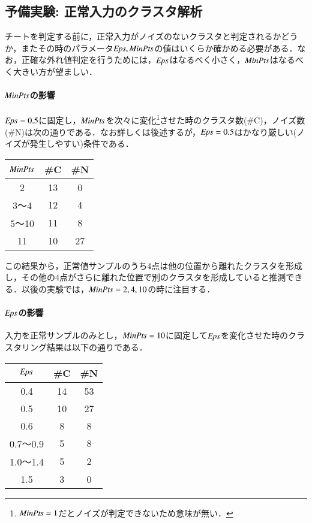 \subsection{予備実験: 正常入力のクラスタ解析}
チートを判定する前に，正常入力がノイズのないクラスタと判定されるかどうか，またその時のパラメータ${\it Eps}, {\it MinPts}$の値はいくらか確かめる必要がある．なお，正確な外れ値判定を行うためには，${\it Eps}$はなるべく小さく，${\it MinPts}$はなるべく大きい方が望ましい．

\paragraph{${\it MinPts}$の影響}
${\it Eps} = 0.5$に固定し，${\it MinPts}$を次々に変化\footnote{${\it MinPts} = 1$だとノイズが判定できないため意味が無い．}させた時のクラスタ数(\#C)，ノイズ数(\#N)は次の通りである．なお詳しくは後述するが，${\it Eps} = 0.5$はかなり厳しい(ノイズが発生しやすい)条件である．

\begin{table}[htbp]
\begin{center}
\begin{tabular}{c|cc}
${\it MinPts}$ & \#C & \#N \\ \hline
2 & 13 & 0 \\
3〜4 & 12 & 4 \\
5〜10 & 11 & 8 \\
11 & 10 & 27
\end{tabular}
\end{center}
\end{table}

この結果から，正常値サンプルのうち4点は他の位置から離れたクラスタを形成し，その他の4点がさらに離れた位置で別のクラスタを形成していると推測できる．以後の実験では，${\it MinPts}=2, 4, 10$の時に注目する．

\paragraph{${\it Eps}$の影響}
入力を正常サンプルのみとし，${\it MinPts} = 10$に固定して${\it Eps}$を変化させた時のクラスタリング結果は以下の通りである．

\begin{table}[htbp]
\begin{center}
\begin{tabular}{c|cc}
${\it Eps}$ & \#C & \#N \\ \hline
0.4 & 14 & 53 \\
0.5 & 10 & 27 \\
0.6 & 8 & 8 \\
0.7〜0.9 & 5 & 8 \\
1.0〜1.4 & 5 & 2 \\
1.5 & 3 & 0
\end{tabular}
\end{center}
\end{table}

